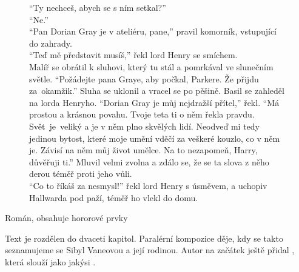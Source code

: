 \documentclass[FGBook.tex]{subfiles}
\begin{document}

\noindent\begin{figure}\footnotesize
{}
\setlength{\parindent}{3pt}
\noindent
\enquote{Ty nechceš, abych se s ním setkal?} \\
\enquote{Ne.} \\
\enquote{Pan Dorian Gray je v ateliéru, pane,} pravil komorník, vstupující do zahrady. \\
\enquote{Teď mě představit musíš,} řekl lord Henry se smíchem. \\
Malíř se obrátil k sluhovi, který tu stál a pomrkával ve slunečním světle.
\enquote{Požádejte pana Graye, aby počkal, Parkere. Že přijdu za~okamžik.}
Sluha se uklonil a vracel se po pěšině.
Basil se zahleděl na lorda Henryho.
\enquote{Dorian Gray je můj nejdražší přítel,} řekl.
\enquote{Má prostou a krásnou povahu.
Tvoje teta ti o něm řekla pravdu.
Svět~je~veliký a je v něm plno skvělých lidí.
Neodveď mi tedy jedinou bytost, které moje umění vděčí za veškeré kouzlo, co v něm je.
Závisí na něm můj život umělce.
Na to nezapomeň, Harry, důvěřuji ti.}
Mluvil velmi zvolna a zdálo se, že se ta slova z něho derou téměř proti jeho vůli. \\
\enquote{Co to říkáš za nesmysl!} řekl lord Henry s úsměvem, a uchopiv Hallwarda pod paží,
téměř ho vlekl do domu. 
\end{figure}


\noindent
Román, obsahuje hororové prvky





\noindent 
Text je rozdělen do dvaceti kapitol.
Paralérní kompozice děje, kdy se takto seznamujeme se Sibyl Vaneovou a její rodinou.
Autor na začátek ještě přidal , která slouží jako jakýsi .
\end{document}
